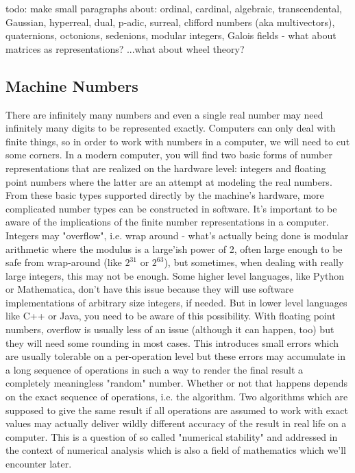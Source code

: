 \medskip
todo: make small paragraphs about: ordinal, cardinal, algebraic, transcendental, Gaussian, hyperreal, dual, p-adic, surreal, clifford numbers (aka multivectors), quaternions, octonions, sedenions, modular integers, Galois fields - what about matrices as representations? ...what about wheel theory?




%

\subsection{Machine Numbers}
There are infinitely many numbers and even a single real number may need infinitely many digits to be represented exactly. Computers can only deal with finite things, so in order to work with numbers in a computer, we will need to cut some corners. In a modern computer, you will find two basic forms of number representations that are realized on the hardware level: integers and floating point numbers where the latter are an attempt at modeling the real numbers. From these basic types supported directly by the machine's hardware, more complicated number types can be constructed in software. It's important to be aware of the implications of the finite number representations in a computer. Integers may "overflow", i.e. wrap around - what's actually being done is modular arithmetic where the modulus is a large'ish power of 2, often large enough to be safe from wrap-around (like $2^{31}$ or $2^{63}$), but sometimes, when dealing with really large integers, this may not be enough. Some higher level languages, like Python or Mathematica, don't have this issue because they will use software implementations of arbitrary size integers, if needed. But in lower level languages like C++ or Java, you need to be aware of this possibility. With floating point numbers, overflow is usually less of an issue (although it can happen, too) but they will need some rounding in most cases. This introduces small errors which are usually tolerable on a per-operation level but these errors may accumulate in a long sequence of operations in such a way to render the final result a completely meaningless "random" number. Whether or not that happens depends on the exact sequence of operations, i.e. the algorithm. Two algorithms which are supposed to give the same result if all operations are assumed to work with exact values may actually deliver wildly different accuracy of the result in real life on a computer. This is a question of so called "numerical stability" and addressed in the context of numerical analysis which is also a field of mathematics which we'll encounter later.

